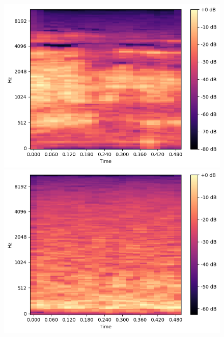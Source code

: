 \begin{figure}[t]
\begin{minipage}[b]{0.16\hsize}
        \includegraphics[width=\hsize]{img/melspec/soup.png}
    \end{minipage}
    \begin{minipage}[b]{0.16\hsize}
        \centering
        \includegraphics[width=\hsize]{img/melspec/salad.png}
    \end{minipage}
    \begin{minipage}[b]{0.16\hsize}
        \centering

\end{minipage}
\end{figure}
